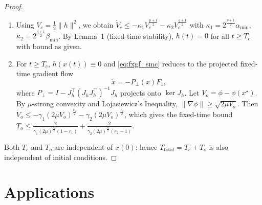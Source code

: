 \documentclass[letterpaper, 10 pt, conference]{ieeeconf}
\begin{document}
\begin{proof}
\begin{enumerate}
    \item Using $V_c=\frac{1}{2}\|h\|^2$, we obtain $\dot{V}_c \leq -\kappa_1 V_c^{\frac{p+1}{2}} - \kappa_2 V_c^{\frac{q+1}{2}}$ with $\kappa_1=2^{\frac{p+1}{2}}\alpha_{\min}$, $\kappa_2=2^{\frac{q+1}{2}}\beta_{\min}$. By Lemma~1 (fixed-time stability), $h(t)=0$ for all $t\geq T_c$ with bound as given.

    \item For $t \geq T_c$, $h(x(t)) \equiv 0$ and \eqref{eq:fxgf_smc} reduces to the projected fixed-time gradient flow
\[
\dot{x} = -P_\perp(x)F_1,
\]
where $P_\perp = I - J_h^\top(J_h J_h^\top)^{-1}J_h$ projects onto $\ker J_h$. Let $V_o = \phi - \phi(x^\star)$. By $\mu$-strong convexity and Lojasiewicz’s Inequality, $\|\nabla\phi\| \geq \sqrt{2\mu V_o}$. Then $\dot{V}_o \leq -\gamma_1(2\mu V_o)^{\frac{r_1}{2}} - \gamma_2(2\mu V_o)^{\frac{r_2}{2}}$, which gives the fixed-time bound $T_o \leq \frac{2}{\gamma_1(2\mu)^{\frac{r_1}{2}}(1-r_1)} + \frac{2}{\gamma_2(2\mu)^{\frac{r_2}{2}}(r_2-1)}$.
\end{enumerate}
Both $T_c$ and $T_o$ are independent of $x(0)$; hence $T_{\mathrm{total}} = T_c + T_o$ is also independent of initial conditions.
\end{proof}
\section{Applications}
\end{document}
